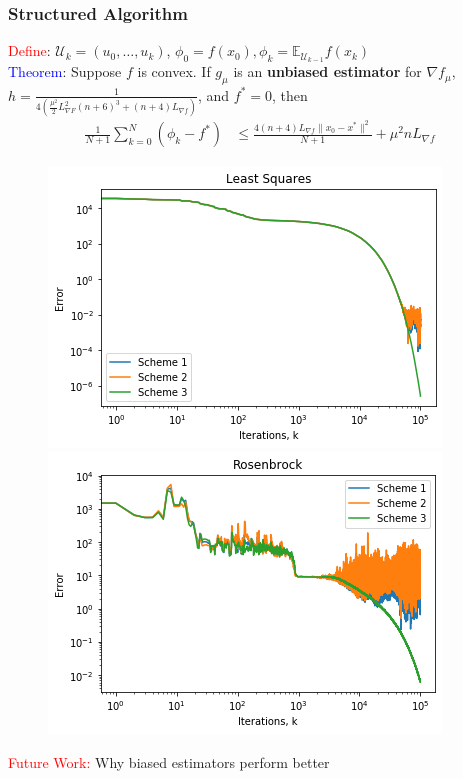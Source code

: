 \documentclass{beamer}
\begin{document}
\begin{frame}
	\frametitle{Structured Algorithm}
\textcolor{red}{Define}: $\mathcal{U}_k = (u_0, \dots, u_k)$, $\phi_0 = f(x_0), \phi_k = \mathbb{E}_{\mathcal{U}_{k-1}}f(x_k)$ \\ \vspace{0.25in}
\textcolor{blue}{Theorem}: Suppose $f$ is convex. If $g_{\mu}$ is an \textbf{unbiased estimator} for $\nabla f_{\mu}$, $h = \frac{1}{4\left(\frac{\mu^2}{2}L_{\nabla F}^2(n+6)^3 + (n+4)L_{\nabla f}\right)} $, and $f^* = 0$, then 
\begin{align*}
\frac{1}{N+1}\sum_{k=0}^N(\phi_k - f^*) & \leq \frac{4(n+4)L_{\nabla f}\|x_0 - x^*\|^2}{N+1} + \mu^2nL_{\nabla f}
\end{align*}

\begin{figure}[ht]
	\centering
	\begin{minipage}[b]{0.45\linewidth}
		\includegraphics[scale=0.30]{leastSquaresSassy.png}
	\end{minipage}
	\quad
	\begin{minipage}[b]{0.45\linewidth}
		\includegraphics[scale=0.30]{rosenbrockSassy.png}
	\end{minipage}
	\end{figure}

\textcolor{red}{Future Work:} Why biased estimators perform better 
\end{frame}
\end{document}
